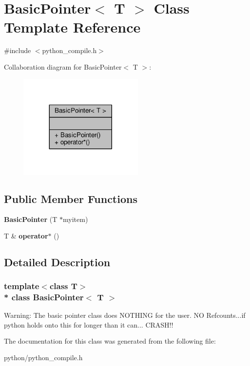 \hypertarget{classBasicPointer}{}\section{Basic\+Pointer$<$ T $>$ Class Template Reference}
\label{classBasicPointer}


{\ttfamily \#include $<$python\+\_\+compile.\+h$>$}



Collaboration diagram for Basic\+Pointer$<$ T $>$\+:
\nopagebreak
\begin{figure}[H]
\begin{center}
\leavevmode
\includegraphics[width=176pt]{d3/d52/classBasicPointer__coll__graph}
\end{center}
\end{figure}
\subsection*{Public Member Functions}
\begin{DoxyCompactItemize}
\item 
{\bfseries Basic\+Pointer} (T $\ast$myitem)\hypertarget{classBasicPointer_ac66747806d418557e803c2f1702a990f}{}\label{classBasicPointer_ac66747806d418557e803c2f1702a990f}

\item 
T \& {\bfseries operator$\ast$} ()\hypertarget{classBasicPointer_a304a13fa65a836801e33b9679b9d9667}{}\label{classBasicPointer_a304a13fa65a836801e33b9679b9d9667}

\end{DoxyCompactItemize}


\subsection{Detailed Description}
\subsubsection*{template$<$class T$>$\\*
class Basic\+Pointer$<$ T $>$}

Warning\+: The basic pointer class does N\+O\+T\+H\+I\+NG for the user. NO Refcounts...if python holds onto this for longer than it can... C\+R\+A\+S\+H!! 

The documentation for this class was generated from the following file\+:\begin{DoxyCompactItemize}
\item 
python/python\+\_\+compile.\+h\end{DoxyCompactItemize}
